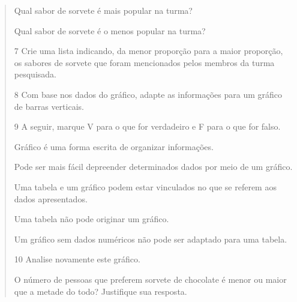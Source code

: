 \begin{quote}
\begin{escolha}


\item Qual sabor de sorvete é mais popular na turma?



\item Qual sabor de sorvete é o menos popular na turma?

\end{escolha}

\num{7} Crie uma lista indicando, da menor proporção para a maior proporção, os sabores de sorvete que foram mencionados pelos membros da turma pesquisada.



\num{8} Com base nos dados do gráfico, adapte as informações para um gráfico de barras verticais.



\num{9} A seguir, marque V para o que for verdadeiro e F para o que for falso.

\begin{boxlist}
 Gráfico é uma forma escrita de organizar informações.

 Pode ser mais fácil depreender determinados dados por meio de um gráfico.

 Uma tabela e um gráfico podem estar vinculados no que se referem aos dados apresentados.

 Uma tabela não pode originar um gráfico.

 Um gráfico sem dados numéricos não pode ser adaptado para uma tabela.
\end{boxlist}

\num{10} Analise novamente este gráfico.


O número de pessoas que preferem sorvete de chocolate é menor ou maior que a metade do todo? Justifique sua resposta.



\end{quote}
